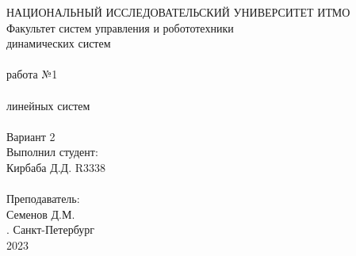\documentclass[12pt]{article}
\begin{document}
\begin{titlepage}
\begin{center}
    {\small НАЦИОНАЛЬНЫЙ ИССЛЕДОВАТЕЛЬСКИЙ УНИВЕРСИТЕТ ИТМО} \\
    {\small Факультет систем управления и робототехники} \\
    \vspace*{10\baselineskip}
    { динамических систем} \\
    \ \\
    { работа №1} \\
    \ \\
    { линейных систем} \\
    \ \\
    Вариант 2 \\
    \vspace*{10\baselineskip}
    \hfill {\small Выполнил студент:} \\
    \hfill {\small Кирбаба Д.Д. R3338} \\
    \ \\
    \hfill {\small Преподаватель:} \\
    \hfill {\small Семенов Д.М.} \\
    \mbox{}
    \vfill {. Санкт-Петербург\\2023}
\end{center}
\end{titlepage}
\end{document}
